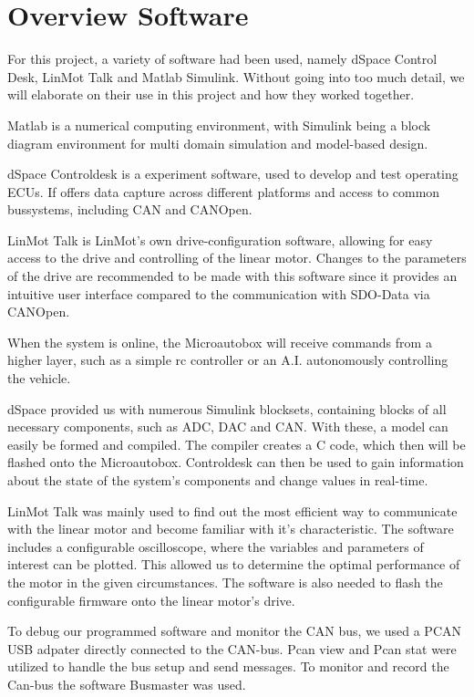 
\chapter{Overview Software}
\label{chp:Software}

For this project, a variety of software had been used, namely dSpace Control Desk, LinMot Talk and Matlab Simulink. Without going into too much detail, we will elaborate on their use in this project and how they worked together.


Matlab is a numerical computing environment, with Simulink being a block diagram environment for multi domain simulation and model-based design.

dSpace Controldesk is a experiment software, used to develop and test operating ECUs. If offers data capture across different platforms and access to common bussystems, including CAN and CANOpen.

LinMot Talk is LinMot's own drive-configuration software, allowing for easy access to the drive and controlling of the linear motor. Changes to the parameters of the drive are recommended to be made with this software since it provides an intuitive user interface compared to the communication with SDO-Data via CANOpen.

When the system is online, the Microautobox will receive commands from a higher layer, such as a simple rc controller or an A.I. autonomously controlling the vehicle. 

dSpace provided us with numerous Simulink blocksets, containing blocks of all necessary components, such as ADC, DAC and CAN. With these, a model can easily be formed and compiled. The compiler creates a C code, which then will be flashed onto the Microautobox. Controldesk can then be used to gain information about the state of the system's components and change values in real-time.

LinMot Talk was mainly used to find out the most efficient way to communicate with the linear motor and become familiar with it's characteristic. The software includes a configurable oscilloscope, where the variables and parameters of interest can be plotted. This allowed us to determine the optimal performance of the motor in the given circumstances.
The software is also needed to flash the configurable firmware onto the linear motor's drive. 

To debug our programmed software and monitor the CAN bus, we used a PCAN USB adpater directly connected to the CAN-bus. Pcan view and Pcan stat were utilized to handle the bus setup and send messages. To monitor and record the Can-bus the software Busmaster was used.

